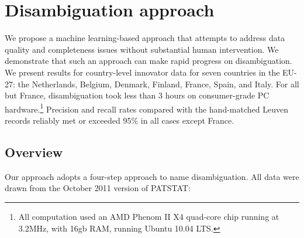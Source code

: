 \documentclass[11pt]{article}
\begin{document}
\section{Disambiguation approach}
\label{sec:disamb-appr}

We propose a machine learning-based approach that attempts to address
data quality and completeness issues without substantial human
intervention. We demonstrate that such an approach can make rapid
progress on disambiguation. We present results for country-level
innovator data for seven countries in the EU-27: the Netherlands,
Belgium, Denmark, Finland, France, Spain, and Italy. For all but
France, disambiguation took less than 3 hours on consumer-grade PC
hardware.\footnote{All computation used an AMD Phenom II X4 quad-core
chip running at 3.2MHz, with 16gb RAM, running Ubuntu 10.04 LTS.}
Precision and recall rates compared with the hand-matched Leuven
records reliably met or exceeded 95\% in all cases except France.

\subsection{Overview}
\label{sec:overview}

Our approach adopts a four-step approach to name disambiguation. All
data were drawn from the October 2011 version of PATSTAT:
\end{document}
